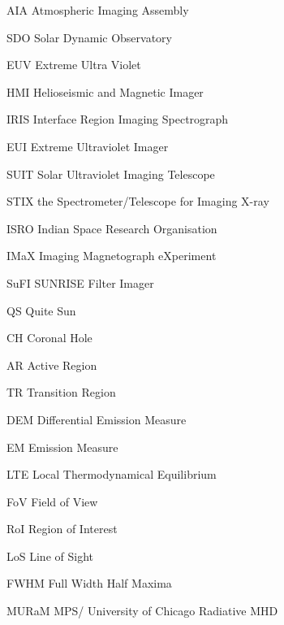 \begin{abbrv}

\item[AIA]  Atmospheric Imaging Assembly
\item[SDO]  Solar Dynamic Observatory
\item[EUV]  Extreme Ultra Violet
\item[HMI]  Helioseismic and Magnetic Imager 
\item[IRIS] Interface Region Imaging Spectrograph 
\item[EUI]  Extreme Ultraviolet Imager
\item[SUIT] Solar Ultraviolet Imaging Telescope
\item[STIX] the Spectrometer/Telescope for Imaging X-ray 
\item[ISRO] Indian Space Research Organisation 
\item[IMaX] Imaging Magnetograph eXperiment
\item[SuFI] SUNRISE Filter Imager
\item[QS]   Quite Sun
\item[CH]   Coronal Hole
\item[AR]   Active Region
\item[TR]   Transition Region
\item[DEM]  Differential Emission Measure
\item[EM]   Emission Measure
\item[LTE]  Local Thermodynamical Equilibrium 
\item[FoV]  Field of View
\item[RoI]  Region of Interest 
\item[LoS]  Line of Sight
\item[FWHM] Full Width Half Maxima
\item[MURaM] MPS/ University of Chicago Radiative MHD 

\end{abbrv}
